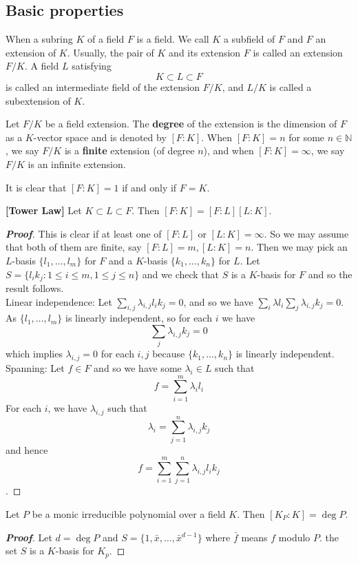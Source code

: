 \subsection{Basic properties}
\begin{definition} When a subring $K$ of a field $F$ is a field. We call $K$ a subfield of $F$ and $F$ an extension of $K$. Usually, the pair of $K$ and its extension $F$ is called an extension $F/K$. A field $L$ satisfying
$$K \subset L \subset F$$ is called an intermediate field of the extension $F/K$, and $L/K$ is called a subextension of $K$.
\end{definition}
\begin{definition} Let $F/K$ be a field extension. The {\bf degree} of the extension is the dimension of $F$ as a $K$-vector space and is denoted by
$[F:K]$. When $[F:K]=n$ for some $n \in \mathbb{N}$, we say $F/K$ is a {\bf finite} extension (of degree $n$), and when $[F:K]=\infty$, we say $F/K$ is an infinite extension.
\end{definition}
\begin{remark} It is clear that $[F:K]=1$ if and only if $F=K$.
\end{remark}
\begin{proposition}{\bf [Tower Law]}\label{T;Tower} Let $K \subset L \subset F$. Then $[F:K]=[F:L][L:K]$.
\end{proposition}
\begin{proof}[\bf Proof] This is clear if at least one of $[F:L]$ or $[L:K]=\infty$. So we may assume that both of them are finite, say $[F:L]=m,[L:K]=n$. Then we may pick an $L$-basis $\{l_1,\ldots,l_m\}$ for $F$ and a $K$-basis
$\{k_1,\ldots,k_n\}$ for $L$. Let $S=\{l_i k_j: 1 \le i \le m, 1 \le j \le n\}$ and we check that $S$ is a $K$-basis for $F$ and so the result follows.\\
Linear independence: Let $\sum_{i,j}\lambda_{i,j}l_i k_j=0$, and so we have
$\sum_{i}\lambda l_i \sum_j \lambda_{i,j} k_j=0$. As $\{l_1,\ldots,l_m\}$ is linearly independent, so for each $i$ we
have
$$\sum_j \lambda_{i,j} k_j=0$$ which implies $\lambda_{i,j}=0$ for each $i,j$ because $\{k_1,\ldots,k_n\}$ is linearly independent.\\
Spanning: Let $f \in F$ and so we have some $\lambda_i \in L$ such that
$$f=\sum_{i=1}^m \lambda_i l_i$$
For each $i$, we have $\lambda_{i,j}$ such that
$$\lambda_i =\sum_{j=1}^n \lambda_{i,j}k_j$$
and hence
$$f=\sum_{i=1}^m\sum_{j=1}^n \lambda_{i,j}l_i k_j$$.
\end{proof}
\begin{proposition} Let $P$ be a monic irreducible polynomial over a field $K$. Then $[K_P:K]=\deg{P}$.
\end{proposition}
\begin{proof}[\bf Proof] Let $d=\deg{P}$ and $S=\{1,\bar{x},\ldots,\bar{x}^{d-1}\}$ where $\bar{f}$ means $f$ modulo $P$.  the set $S$ is a $K$-basis for $K_p$.
\end{proof}
